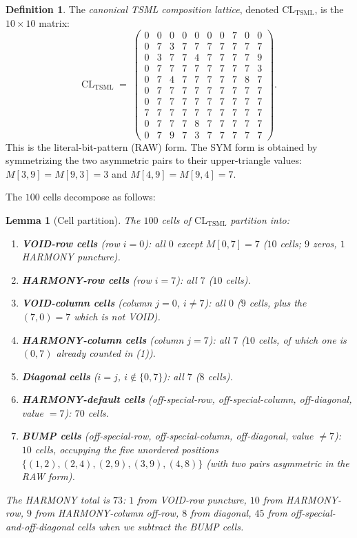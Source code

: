 \documentclass[11pt,reqno]{amsart}
\theoremstyle{plain}
\newtheorem{lemma}[theorem]{Lemma}
\theoremstyle{definition}
\newtheorem{definition}[theorem]{Definition}
\theoremstyle{remark}
\newcommand{\TSML}{\mathrm{TSML}}
\begin{document}
\begin{definition}\label{def:tsml}
The \emph{canonical TSML composition lattice}, denoted
$\mathrm{CL}_\TSML$, is the $10 \times 10$ matrix:
\[
\mathrm{CL}_\TSML \;=\;
\begin{pmatrix}
0 & 0 & 0 & 0 & 0 & 0 & 0 & 7 & 0 & 0 \\
0 & 7 & 3 & 7 & 7 & 7 & 7 & 7 & 7 & 7 \\
0 & 3 & 7 & 7 & 4 & 7 & 7 & 7 & 7 & 9 \\
0 & 7 & 7 & 7 & 7 & 7 & 7 & 7 & 7 & 3 \\
0 & 7 & 4 & 7 & 7 & 7 & 7 & 7 & 8 & 7 \\
0 & 7 & 7 & 7 & 7 & 7 & 7 & 7 & 7 & 7 \\
0 & 7 & 7 & 7 & 7 & 7 & 7 & 7 & 7 & 7 \\
7 & 7 & 7 & 7 & 7 & 7 & 7 & 7 & 7 & 7 \\
0 & 7 & 7 & 7 & 8 & 7 & 7 & 7 & 7 & 7 \\
0 & 7 & 9 & 7 & 3 & 7 & 7 & 7 & 7 & 7
\end{pmatrix}.
\]
This is the literal-bit-pattern (RAW) form. The SYM form is obtained
by symmetrizing the two asymmetric pairs to their upper-triangle
values: $M[3,9] = M[9,3] = 3$ and $M[4,9] = M[9,4] = 7$.
\end{definition}

The $100$ cells decompose as follows:

\begin{lemma}[Cell partition]\label{lem:partition}
The $100$ cells of $\mathrm{CL}_\TSML$ partition into:
\begin{enumerate}
\item \textbf{VOID-row cells} (row $i = 0$): all $0$ except $M[0,7] = 7$
($10$ cells; $9$ zeros, $1$ HARMONY puncture).
\item \textbf{HARMONY-row cells} (row $i = 7$): all $7$ ($10$ cells).
\item \textbf{VOID-column cells} (column $j = 0$, $i \neq 7$):
all $0$ ($9$ cells, plus the $(7,0) = 7$ which is not VOID).
\item \textbf{HARMONY-column cells} (column $j = 7$): all $7$
($10$ cells, of which one is $(0,7)$ already counted in (1)).
\item \textbf{Diagonal cells} ($i = j$, $i \notin \{0, 7\}$):
all $7$ ($8$ cells).
\item \textbf{HARMONY-default cells} (off-special-row, off-special-column,
off-diagonal, value $= 7$): $70$ cells.
\item \textbf{BUMP cells} (off-special-row, off-special-column,
off-diagonal, value $\neq 7$): $10$ cells, occupying the
five unordered positions
$\{(1,2),(2,4),(2,9),(3,9),(4,8)\}$
(with two pairs asymmetric in the RAW form).
\end{enumerate}
The HARMONY total is $73$: $1$ from VOID-row puncture, $10$ from
HARMONY-row, $9$ from HARMONY-column off-row, $8$ from diagonal,
$45$ from off-special-and-off-diagonal cells when we subtract the BUMP cells.
\end{lemma}
\end{document}
